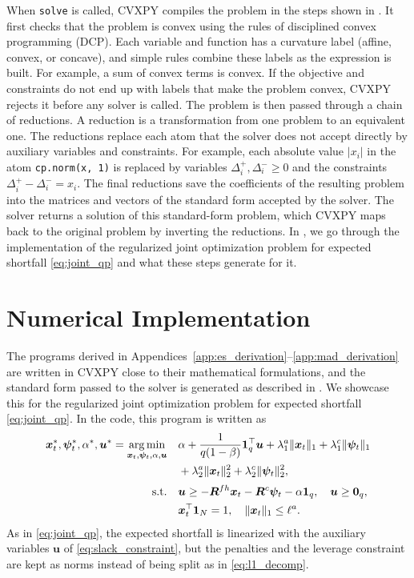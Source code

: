 When \texttt{solve} is called, CVXPY compiles the problem in the steps shown in . 
It first checks that the problem is convex using the rules of disciplined
convex programming (DCP). Each variable and function has a
curvature label (affine, convex, or concave), and simple rules combine these
labels as the expression is built. For example, a sum of convex terms is
convex. If the objective and constraints do not end up with labels that make
the problem convex, CVXPY rejects it before any solver is called. The problem is then passed through a chain of reductions. A reduction is a
transformation from one problem to an equivalent one. The reductions
replace each atom that the solver does not accept directly by auxiliary variables and constraints. For example, each
absolute value $|x_i|$ in the atom \texttt{cp.norm(x, 1)} is replaced by variables $\Delta_i^+, \Delta_i^- \geq 0$ and the constraints $\Delta_i^+ - \Delta_i^- = x_i$.
The final reductions save the coefficients of the resulting problem into
the matrices and vectors of the standard form accepted by the solver. The
solver returns a solution of this standard-form problem, which CVXPY maps back to the original problem by inverting the
reductions. In
, we go through the implementation of the regularized joint 
optimization problem for expected shortfall \eqref{eq:joint_qp} and what these
steps generate for it.

\section{Numerical Implementation} \label{sec:numerical-implementation}

The programs derived in Appendices~\ref{app:es_derivation}--\ref{app:mad_derivation} are  written in CVXPY close to their mathematical formulations, and the
standard form passed to the solver is generated as described in . We showcase this for the
regularized joint optimization problem for expected shortfall \eqref{eq:joint_qp}. In the code, this program is written
as
\begin{equation} \label{eq:joint_es_cvxpy}
\begin{aligned}
    \bm{x}_t^*, \bm{\psi}_t^*, \alpha^*, \bm{u}^* = \operatorname*{arg\,min}_{\bm{x}_t, \bm{\psi}_t, \alpha, \bm{u}} \quad
    & \alpha + \frac{1}{q(1-\beta)} \bm{1}_q^\top \bm{u}
    + \lambda_1^a \|\bm{x}_t\|_1 + \lambda_1^c \|\bm{\psi}_t\|_1 \\
    & + \lambda_2^a \|\bm{x}_t\|_2^2 + \lambda_2^c \|\bm{\psi}_t\|_2^2, \\[2pt]
    \text{s.t.} \quad
    & \bm{u} \ge -\bm{R}^{fh} \bm{x}_t - \bm{R}^c \bm{\psi}_t - \alpha \bm{1}_q, \quad \bm{u} \ge \bm{0}_q, \\
    & \bm{x}_t^\top \bm{1}_N = 1, \quad \|\bm{x}_t\|_1 \le \ell^a.
\end{aligned}
\end{equation}
As in \eqref{eq:joint_qp}, the expected shortfall is linearized with the auxiliary
variables $\bm{u}$ of \eqref{eq:slack_constraint}, but the penalties and the leverage constraint are kept as norms
instead of being split as in \eqref{eq:l1_decomp}.


